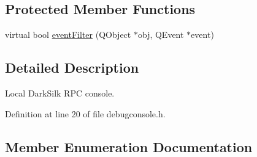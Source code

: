 \subsection*{Protected Member Functions}
\begin{DoxyCompactItemize}
\item 
virtual bool \hyperlink{class_d_e_b_u_g_console_a4e3e4f61f3a1de7286149c527b7efe18}{event\+Filter} (Q\+Object $\ast$obj, Q\+Event $\ast$event)
\end{DoxyCompactItemize}


\subsection{Detailed Description}
Local Dark\+Silk R\+P\+C console. 

Definition at line 20 of file debugconsole.\+h.



\subsection{Member Enumeration Documentation}
\hypertarget{class_d_e_b_u_g_console_ab4d5228b2f3681131add4278aca4127f}{}
